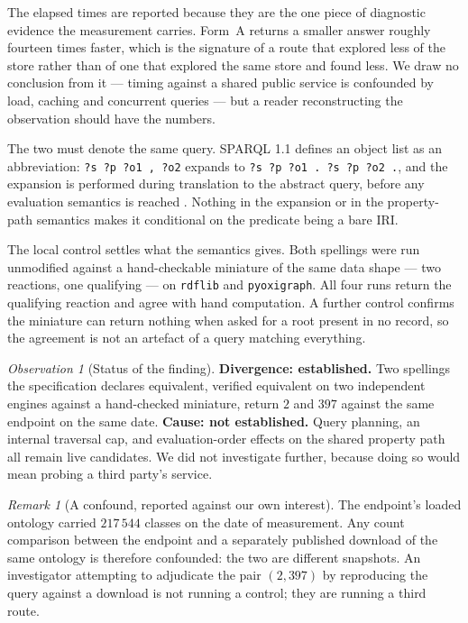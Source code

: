 \documentclass[11pt,twocolumn,a4paper]{article}
\theoremstyle{thmstyle}
\theoremstyle{definition}
\theoremstyle{remark}
\newtheorem{remark}[theorem]{Remark}
\newtheorem{observation}[theorem]{Observation}
\begin{document}
The elapsed times are reported because they are the one piece of diagnostic
evidence the measurement carries. Form~A returns a smaller answer roughly
fourteen times faster, which is the signature of a route that explored less of
the store rather than of one that explored the same store and found less. We
draw no conclusion from it --- timing against a shared public service is
confounded by load, caching and concurrent queries --- but a reader
reconstructing the observation should have the numbers.

The two must denote the same query. SPARQL 1.1 defines an object list as an
abbreviation: \texttt{?s ?p ?o1 , ?o2} expands to
\texttt{?s ?p ?o1 . ?s ?p ?o2 .}, and the expansion is performed during
translation to the abstract query, before any evaluation semantics is reached
\citep{sparql11}. Nothing in the expansion or in the property-path semantics
makes it conditional on the predicate being a bare IRI.

The local control settles what the semantics gives. Both spellings were run
unmodified against a hand-checkable miniature of the same data shape --- two
reactions, one qualifying --- on \texttt{rdflib} and \texttt{pyoxigraph}. All
four runs return the qualifying reaction and agree with hand computation. A
further control confirms the miniature can return nothing when asked for a
root present in no record, so the agreement is not an artefact of a query
matching everything.

\begin{observation}[Status of the finding]
\label{obs:status}
\textbf{Divergence: established.} Two spellings the specification declares
equivalent, verified equivalent on two independent engines against a
hand-checked miniature, return $2$ and $397$ against the same endpoint on the
same date. \textbf{Cause: not established.} Query planning, an internal
traversal cap, and evaluation-order effects on the shared property path all
remain live candidates. We did not investigate further, because doing so
would mean probing a third party's service.
\end{observation}

\begin{remark}[A confound, reported against our own interest]
\label{rem:snapshot}
The endpoint's loaded ontology carried $217\,544$ classes on the date of
measurement. Any count comparison between the endpoint and a separately
published download of the same ontology is therefore confounded: the two are
different snapshots. An investigator attempting to adjudicate the pair
$(2,397)$ by reproducing the query against a download is not running a
control; they are running a third route.
\end{remark}
\end{document}
